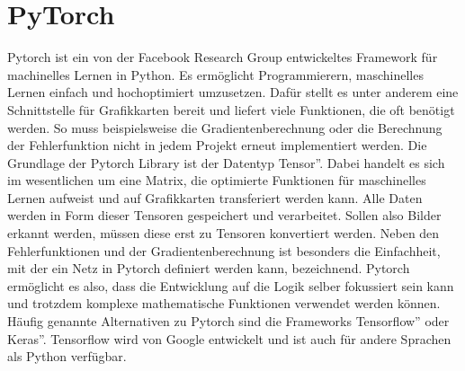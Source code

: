 \documentclass[11pt]{article}
\begin{document}
\section{PyTorch}
Pytorch ist ein von der Facebook Research Group entwickeltes Framework für machinelles Lernen in Python. Es ermöglicht Programmierern, maschinelles Lernen einfach und hochoptimiert umzusetzen. Dafür stellt es unter anderem eine Schnittstelle für Grafikkarten bereit und liefert viele Funktionen, die oft benötigt werden. So muss beispielsweise die Gradientenberechnung oder die Berechnung der Fehlerfunktion nicht in jedem Projekt erneut implementiert werden. Die Grundlage der Pytorch Library ist der Datentyp \glqq Tensor''. Dabei handelt es sich im wesentlichen um eine Matrix, die optimierte Funktionen für maschinelles Lernen aufweist und auf Grafikkarten transferiert werden kann. Alle Daten werden in Form dieser Tensoren gespeichert und verarbeitet. Sollen also Bilder erkannt werden, müssen diese erst zu Tensoren konvertiert werden. Neben den Fehlerfunktionen und der Gradientenberechnung ist besonders die Einfachheit, mit der ein Netz in Pytorch definiert werden kann, bezeichnend. Pytorch ermöglicht es also, dass die Entwicklung auf die Logik selber fokussiert sein kann und trotzdem komplexe mathematische Funktionen verwendet werden können. Häufig genannte Alternativen zu Pytorch sind die Frameworks \glqq Tensorflow'' oder \glqq Keras''. Tensorflow wird von Google entwickelt und ist auch für andere Sprachen als Python verfügbar.
\end{document}

